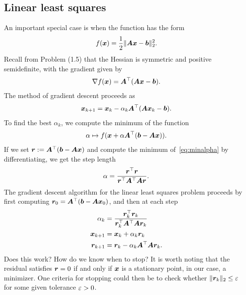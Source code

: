 \subsection{Linear least squares} An important special case is when the function has the form
\begin{equation*}
 f(\bm{x}) = \frac{1}{2}\Vert {\bm{A}\bm{x}-\bm{b}}\Vert_2^2.
\end{equation*}
Recall from Problem (1.5) that the Hessian is symmetric and positive semidefinite, with the gradient given by
\begin{equation*}
 \nabla f(\bm{x}) = \bm{A}^{\top}(\bm{A}\bm{x}-\bm{b}).
\end{equation*}
The method of gradient descent proceeds as
\begin{equation*}
 \bm{x}_{k+1} = \bm{x}_k-\alpha_k \bm{A}^{\top}(\bm{A}\bm{x}_k-\bm{b}).
\end{equation*}
To find the best $\alpha_k$, we compute the minimum of the function
\begin{equation}\label{eq:minalpha}
 \alpha \mapsto f(\bm{x}+\alpha \bm{A}^{\top}(\bm{b}-\bm{A}\bm{x})).
\end{equation}
If we set $\bm{r}:=\bm{A}^{\top}(\bm{b}-\bm{A}\bm{x})$ and compute the minimum of~\eqref{eq:minalpha} by differentiating, we get the step length
\begin{equation*}
 \alpha = \frac{\bm{r}^{\top}\bm{r}}{\bm{r}^{\top}\bm{A}^\top\bm{A}\bm{r}}.
\end{equation*}
The gradient descent algorithm for the linear least squares problem proceeds by first computing $\bm{r}_0=\bm{A}^{\top}(\bm{b}-\bm{A}\bm{x}_0)$, and then at each step
\begin{align*}
 \alpha_k &= \frac{\bm{r}_k^{\top}\bm{r}_k}{\bm{r}_k^{\top}\bm{A}^\top\bm{A}\bm{r}_k}\\
 \bm{x}_{k+1} &= \bm{x}_k+\alpha_k \bm{r}_k\\
 \bm{r}_{k+1} &= \bm{r}_k - \alpha_{k}\bm{A}^{\top}\bm{A}\bm{r}_k.
\end{align*}
Does this work? How do we know when to stop? It is worth noting that the residual satisfies $\bm{r}=0$ if and only if $\bm{x}$ is a stationary point, in our case, a minimizer. One criteria for stopping could then be to check whether $\Vert {\bm{r}_k}\Vert_2\leq \varepsilon$ for some given tolerance $\varepsilon>0$.

